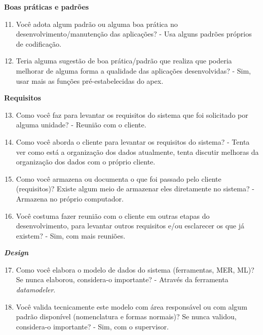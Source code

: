\begin{anexosenv}
\textbf{Boas práticas e padrões}

\begin{enumerate}
\setcounter{enumi}{10}
\item Você adota algum padrão ou alguma boa prática no desenvolvimento/manutenção das
aplicações?\newline
- Usa alguns padrões próprios de codificação.
\item Teria alguma sugestão de boa prática/padrão que realiza que poderia melhorar de
alguma forma a qualidade das aplicações desenvolvidas?\newline
- Sim, usar mais as funções pré-estabelecidas do apex.
\end{enumerate}

\textbf{Requisitos}

\begin{enumerate}
\setcounter{enumi}{12}
\item Como você faz para levantar os requisitos do sistema que foi solicitado por alguma
unidade?\newline
- Reunião com o cliente.
\item Como você aborda o cliente para levantar os requisitos do sistema?\newline
- Tenta ver como está a organização dos dados atualmente, tenta discutir melhoras da organização dos dados com o próprio cliente.
\item Como você armazena ou documenta o que foi passado pelo cliente (requisitos)? Existe
algum meio de armazenar eles diretamente no sistema?\newline
- Armazena no próprio computador.
\item Você costuma fazer reunião com o cliente em outras etapas do desenvolvimento, para
levantar outros requisitos e/ou esclarecer os que já existem?\newline
- Sim, com mais reuniões.
\end{enumerate}

\textbf{\textit{Design}}

\begin{enumerate}
\setcounter{enumi}{16}
\item Como você elabora o modelo de dados do sistema (ferramentas, MER, ML)? Se nunca
elaborou, considera-o importante?\newline
- Através da ferramenta \textit{datamodeler}.
\item Você valida tecnicamente este modelo com área responsável ou com algum padrão
disponível (nomenclatura e formas normais)? Se nunca validou, considera-o importante?\newline
- Sim, com o supervisor.
\end{enumerate}


\end{anexosenv}

